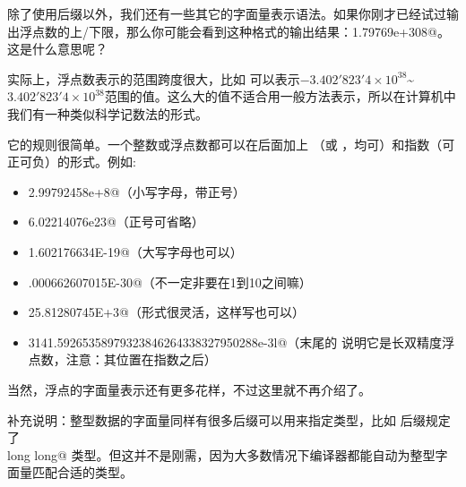 除了使用后缀以外，我们还有一些其它的字面量表示语法。如果你刚才已经试过输出浮点数的上/下限，那么你可能会看到这种格式的输出结果：\lstinline@1.79769e+308@。这是什么意思呢？\par
实际上，浮点数表示的范围跨度很大，比如 \lstinline@float@ 可以表示$-3.402'823'4\times10^{38}$\~{}$3.402'823'4\times10^{38}$范围的值。这么大的值不适合用一般方法表示，所以在计算机中我们有一种类似科学记数法的形式。\par
它的规则很简单。一个整数或浮点数都可以在后面加上 \lstinline@e@（或 \lstinline@E@，均可）和指数（可正可负）的形式。例如:
\begin{itemize}
    \item \lstinline@2.99792458e+8@（小写字母，带正号）
    \item \lstinline@6.02214076e23@（正号可省略）
    \item \lstinline@1.602176634E-19@（大写字母也可以）
    \item \lstinline@.000662607015E-30@（不一定非要在1到10之间嘛）
    \item \lstinline@25.81280745E+3@（形式很灵活，这样写也可以）
    \item \lstinline@3141.59265358979323846264338327950288e-3l@（末尾的 \lstinline@l@ 说明它是长双精度浮点数，注意：其位置在指数之后）
\end{itemize}
当然，浮点的字面量表示还有更多花样，不过这里就不再介绍了。\par
补充说明：整型数据的字面量同样有很多后缀可以用来指定类型，比如 \lstinline@ull@ 后缀规定了\\\lstinline@unsigned long long@ 类型。但这并不是刚需，因为大多数情况下编译器都能自动为整型字面量匹配合适的类型。\par
